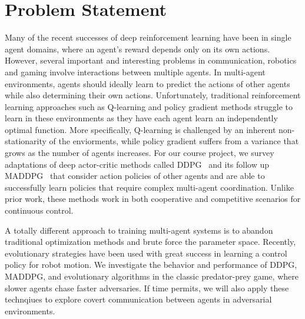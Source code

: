 
\section{Problem Statement}
\label{sec:problem}

Many of the recent successes of deep reinforcement learning have been in
single agent domains, where an agent's reward depends only on its own actions.
However, several important and interesting problems in communication, robotics
and gaming involve interactions between multiple agents. In multi-agent
environments, agents should ideally learn to predict the actions of other
agents while also determining their own actions. Unfortunately, traditional
reinforcement learning approaches such as Q-learning and policy gradient
methods struggle to learn in these environments as they have each agent learn
an independently optimal function. More specifically, Q-learning is challenged by
an inherent non-stationarity of the enviorments, while policy gradient suffers
from a variance that grows as the number of agents increases. For our course
project, we survey adaptations of deep actor-critic methods called DDPG~\cite{lillicrap2016continuous}
and its follow up MADDPG~\cite{lowe2017multi} that consider action policies of 
other agents and are able to successfully learn policies that require complex 
multi-agent coordination. Unlike prior work, these methods work in both cooperative 
and competitive scenarios for continuous control. 

A totally different approach to training multi-agent systems is to abandon 
traditional optimization methods and brute force the parameter space. Recently, 
evolutionary strategies have been used with great success in learning a control 
policy for robot motion. We investigate the behavior and performance of DDPG, MADDPG, 
and evolutionary algorithms in the classic predator-prey game, where slower agents 
chase faster adversaries. If time permits, we will also apply these technqiues 
to explore covert communication between agents in adversarial environments. 
 
